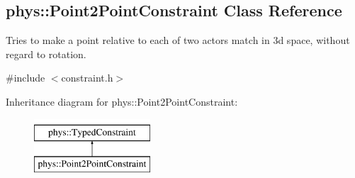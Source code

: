 \hypertarget{classphys_1_1Point2PointConstraint}{
\subsection{phys::Point2PointConstraint Class Reference}
\label{classphys_1_1Point2PointConstraint}
}


Tries to make a point relative to each of two actors match in 3d space, without regard to rotation.  




{\ttfamily \#include $<$constraint.h$>$}

Inheritance diagram for phys::Point2PointConstraint:\begin{figure}[H]
\begin{center}
\leavevmode
\includegraphics[height=2.000000cm]{classphys_1_1Point2PointConstraint}
\end{center}
\end{figure}
